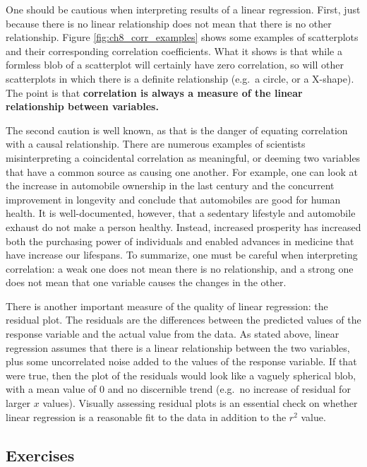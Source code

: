 \documentclass[
]{book}
\theoremstyle{definition}
\theoremstyle{definition}
\theoremstyle{definition}
\theoremstyle{remark}
\begin{document}
One should be cautious when interpreting results of a linear regression. First, just because there is no linear relationship does not mean that there is no other relationship. Figure \ref{fig:ch8_corr_examples} shows some examples of scatterplots and their corresponding correlation coefficients. What it shows is that while a formless blob of a scatterplot will certainly have zero correlation, so will other scatterplots in which there is a definite relationship (e.g.~a circle, or a X-shape). The point is that \textbf{correlation is always a measure of the linear relationship between variables.}

The second caution is well known, as that is the danger of equating correlation with a causal relationship. There are numerous examples of scientists misinterpreting a coincidental correlation as meaningful, or deeming two variables that have a common source as causing one another. For example, one can look at the increase in automobile ownership in the last century and the concurrent improvement in longevity and conclude that automobiles are good for human health. It is well-documented, however, that a sedentary lifestyle and automobile exhaust do not make a person healthy. Instead, increased prosperity has increased both the purchasing power of individuals and enabled advances in medicine that have increase our lifespans. To summarize, one must be careful when interpreting correlation: a weak one does not mean there is no relationship, and a strong one does not mean that one variable causes the changes in the other.

There is another important measure of the quality of linear regression: the  residual plot. The residuals are the differences between the predicted values of the response variable and the actual value from the data. As stated above, linear regression assumes that there is a linear relationship between the two variables, plus some uncorrelated noise added to the values of the response variable. If that were true, then the plot of the residuals would look like a vaguely spherical blob, with a mean value of 0 and no discernible trend (e.g.~no increase of residual for larger \(x\) values). Visually assessing residual plots is an essential check on whether linear regression is a reasonable fit to the data in addition to the \(r^2\) value.

\hypertarget{exercises-10}{%
\subsection{Exercises}\label{exercises-10}}
\end{document}
